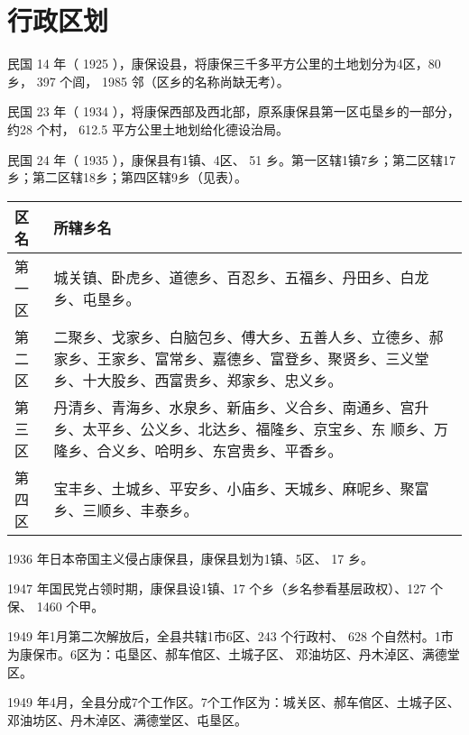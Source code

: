 \chapter{行政区划}
民国 14 年（ 1925 ），康保设县，将康保三千多平方公里的土地划分为4区，80 乡， 397 个闾， 1985 邻（区乡的名称尚缺无考）。

民国 23 年（ 1934 ），将康保西部及西北部，原系康保县第一区屯垦乡的一部分，约28 个村， 612.5 平方公里土地划给化德设治局。

民国 24 年（ 1935 ），康保县有1镇、4区、 51 乡。第一区辖1镇7乡；第二区辖17乡；第二区辖18乡；第四区辖9乡（见表）。

\begin{table}[ht]
    \centering
    \begin{tabular}{p{}<{\centering}p{}<{\centering}}
        \toprule[1.5pt]
        区名  & 所辖乡名                                                                       \\
        \midrule[0.75pt]
        第一区 & 城关镇、卧虎乡、道德乡、百忍乡、五福乡、丹田乡、白龙乡、屯垦乡。                                           \\
        第二区 & 二聚乡、戈家乡、白脑包乡、傅大乡、五善人乡、立德乡、郝家乡、王家乡、富常乡、嘉德乡、富登乡、聚贤乡、三义堂乡、十大股乡、西富贵乡、郑家乡、忠义乡。  \\
        第三区 & 丹清乡、青海乡、水泉乡、新庙乡、义合乡、南通乡、宫升乡、太平乡、公义乡、北达乡、福隆乡、京宝乡、东 顺乡、万隆乡、合义乡、哈明乡、东宫贵乡、平香乡。 \\
        第四区 & 宝丰乡、土城乡、平安乡、小庙乡、天城乡、麻呢乡、聚富乡、三顺乡、丰泰乡。                                       \\
        \bottomrule[1.5pt]
    \end{tabular}
\end{table}

1936 年日本帝国主义侵占康保县，康保县划为1镇、5区、 17 乡。

1947 年国民党占领时期，康保县设1镇、17 个乡（乡名参看基层政权）、127 个保、 1460 个甲。

1949 年1月第二次解放后，全县共辖1市6区、243 个行政村、 628 个自然村。1市为康保市。6区为：屯垦区、郝车倌区、土城子区、 邓油坊区、丹木淖区、满德堂区。

1949 年4月，全县分成7个工作区。7个工作区为：城关区、郝车倌区、土城子区、邓油坊区、丹木淖区、满德堂区、屯垦区。

